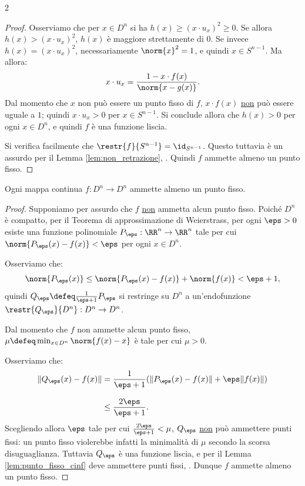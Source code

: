\begin{multicols*}{2}
\begin{proof}
        Osserviamo che per $x \in D^n$ si ha $h(x) \geq (x \cdot u_x)^2 \geq 0$. Se allora $h(x) > (x \cdot u_x)^2$,
        $h(x)$ è maggiore strettamente di $0$. Se invece $h(x) = (x \cdot u_x)^2$, necessariamente $\norm{x}^2 = 1$,
        e quindi $x \in S^{n-1}$. Ma allora:
        \[
            x \cdot u_x = \frac{1 - x \cdot f(x)}{\norm{x - g(x)}}.
        \]
        Dal momento che $x$ non può essere un punto fisso di $f$, $x \cdot f(x)$ \underline{non} può essere uguale a $1$; quindi
        $x \cdot u_x > 0$ per $x \in S^{n-1}$. Si conclude allora che $h(x) > 0$ per ogni $x \in D^n$, e quindi $f$
        è una funzione liscia. \smallskip

        Si verifica facilmente che $\restr{f}{S^{n-1}} = \id_{S^{n-1}}$. Questo tuttavia è un assurdo
        per il Lemma \ref{lem:non_retrazione}, \Lightning. Quindi $f$ ammette almeno un punto fisso.
    \end{proof}

    \begin{theorem}
        Ogni mappa continua $f : D^n \to D^n$ ammette almeno un punto fisso.
    \end{theorem}

    \begin{proof}
        Supponiamo per assurdo che $f$ \underline{non} ammetta alcun punto fisso. Poiché $D^n$
        è compatto, per il Teorema di approssimazione di Weierstrass, per ogni $\eps > 0$
        esiste una funzione polinomiale $P_\eps : \RR^n \to \RR^n$ tale per cui
        $\norm{P_\eps(x) - f(x)} < \eps$ per ogni $x \in D^n$. \smallskip

        Osserviamo che:
        \[
            \norm{P_\eps(x)} \leq \norm{P_\eps(x) - f(x)} + \norm{f(x)} < \eps + 1,
        \]
        quindi $Q_\eps \defeq \frac{1}{\eps + 1} P_\eps$ si restringe su $D^n$ a
        un'endofunzione $\restr{Q_\eps}{D^n} : D^n \to D^n$. \smallskip

        Dal momento che $f$ non ammette alcun punto fisso, $\mu \defeq \min_{x \in D^n} \norm{f(x) - x}$ è
        tale per cui $\mu > 0$. \smallskip

        Osserviamo che:
        \begin{equation*}
            \begin{aligned}
                \|Q_\eps(x) - f(x)\| & = \frac{1}{\eps + 1} (\|P_\eps(x) - f(x)\| + \eps \|f(x)\|) \\[0.1in]
                                     & \leq \frac{2 \eps}{\eps + 1}.
            \end{aligned}
        \end{equation*}
        Scegliendo allora $\eps$ tale per cui $\frac{2 \eps}{\eps + 1} < \mu$, $Q_\eps$ \underline{non} può ammettere
        punti fissi: un punto fisso violerebbe infatti la minimalità di $\mu$ secondo la scorsa disuguaglianza.
        Tuttavia $Q_\eps$ è una funzione liscia, e per il Lemma \ref{lem:punto_fisso_cinf} deve ammettere
        punti fissi, \Lightning. Dunque $f$ ammette almeno un punto fisso.
    \end{proof}


\end{multicols*}
